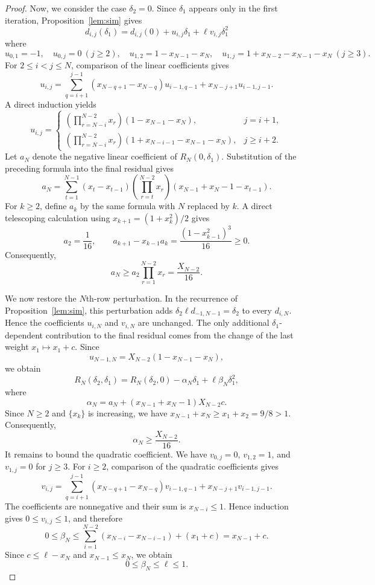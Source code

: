 \documentclass[pdflatex,sn-mathphys-num]{sn-jnl}%
\theoremstyle{thmstyleone}%
\theoremstyle{thmstyletwo}%
\theoremstyle{thmstylethree}%
\begin{document}
\begin{proof}
Now, we consider the case  $\delta_2=0$. Since $\delta_1$ appears only in the first iteration, Proposition~\ref{lem:sim} gives
\[d_{i,j}(\delta_1)=d_{i,j}(0)+u_{i,j}\delta_1+\ell v_{i,j}\delta_1^2\]
where
\[u_{0,1}=-1,\quad u_{0,j}=0\ (j\ge2),\quad u_{1,2}=1-x_{N-1}-x_N,\quad u_{1,j}=1+x_{N-2}-x_{N-1}-x_N\ (j\ge3).\]
For $2\le i<j\le N$, comparison of the linear coefficients gives
\[u_{i,j}=\sum_{q=i+1}^{j-1}(x_{N-q+1}-x_{N-q})u_{i-1,q-1}+x_{N-j+1}u_{i-1,j-1}.\]
A direct induction yields
\[
u_{i,j}=
\begin{cases}
\displaystyle \left(\prod_{r=N-i}^{N-2}x_r\right)(1-x_{N-1}-x_N),&j=i+1,\\[6pt]
\displaystyle \left(\prod_{r=N-i}^{N-2}x_r\right)(1+x_{N-i-1}-x_{N-1}-x_N),&j\ge i+2.
\end{cases}
\]
Let $a_N$ denote the negative linear coefficient of $R_N(0,\delta_1)$. Substitution of the preceding formula into the final residual gives
\[a_N=\sum_{t=1}^{N-1}(x_t-x_{t-1})\left(\prod_{r=t}^{N-2}x_r\right)(x_{N-1}+x_N-1-x_{t-1}).\]
For $k\ge2$, define $a_k$ by the same formula with $N$ replaced by $k$. A direct telescoping calculation using $x_{k+1}=(1+x_k^2)/2$ gives
\[a_2=\frac{1}{16},\qquad a_{k+1}-x_{k-1}a_k=\frac{(1-x_{k-1}^2)^3}{16}\ge0.\]
Consequently,
\[a_N\ge a_2\prod_{r=1}^{N-2}x_r=\frac{X_{N-2}}{16}.\]

We now restore the $N$th-row perturbation. In the recurrence of Proposition~\ref{lem:sim}, this perturbation adds $\delta_2\ell d_{-1,N-1}=\delta_2$ to every $d_{i,N}$. Hence the coefficients $u_{i,N}$ and $v_{i,N}$ are unchanged. The only additional $\delta_1$-dependent contribution to the final residual comes from the change of the last weight $x_1\mapsto x_1+c$. Since
\[u_{N-1,N}=X_{N-2}(1-x_{N-1}-x_N),\]
we obtain
\[R_N(\delta_2,\delta_1)=R_N(\delta_2,0)-\alpha_N\delta_1+\ell\beta_N\delta_1^2,\]
where
\[\alpha_N=a_N+(x_{N-1}+x_N-1)X_{N-2}c.\]
Since $N\ge2$ and $\{x_k\}$ is increasing, we have
$x_{N-1}+x_N\ge x_1+x_2=9/8>1$. Consequently,
\[\alpha_N\ge\frac{X_{N-2}}{16}.\]
It remains to bound the quadratic coefficient. We have $v_{0,j}=0$, $v_{1,2}=1$, and $v_{1,j}=0$ for $j\ge3$. For $i\ge2$, comparison of the quadratic coefficients gives
\[v_{i,j}=\sum_{q=i+1}^{j-1}(x_{N-q+1}-x_{N-q})v_{i-1,q-1}+x_{N-j+1}v_{i-1,j-1}.\]
The coefficients are nonnegative and their sum is $x_{N-i}\le1$. Hence induction gives $0\le v_{i,j}\le1$, and therefore
\[0\le\beta_N\le\sum_{i=1}^{N-2}(x_{N-i}-x_{N-i-1})+(x_1+c)=x_{N-1}+c.\]
Since $c\le\ell-x_N$ and $x_{N-1}\le x_N$, we obtain
\[0\le\beta_N\le\ell\le1.\]


\end{proof}
\end{document}
